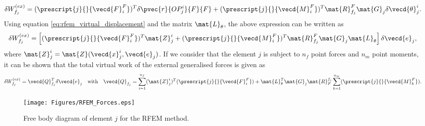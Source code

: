 \[
    \delta W_{f_j}^{(ex)} = (\prescript{j}{}{\vecd{F}^{F}_{i}})^{T} \delta 
    \pvec{r}{OP_{j}^{i}}{F}{F} + (\prescript{j}{}{\vecd{M}^{F}_{i}})^{T}
    \mat{R}_{f_j}^{F} \mat{G}_{j} \delta \vecd{\theta}_{j}^{i}.
\]
Using equation \eqref{eq:rfem_virtual_displacement} and the matrix $\mat{L}_{\theta}$, the above expression can be written as
\begin{equation}
    \delta W_{f_j}^{(ex)} = \left[(\prescript{j}{}{\vecd{F}^{F}_{i}})^{T}
    \mat{Z}_{j}^{i} + (\prescript{j}{}{\vecd{M}^{F}_{i}})^{T}
    \mat{R}_{f_j}^{F} \mat{G}_{j} \mat{L}_{\theta} \right] \delta \vecd{e}_{j},
    \label{eq:rfem_virtual_work_external_one_force}
\end{equation}
where $\mat{Z}_{j}^{i} = \mat{Z}(\vecd{x}_{j}^{i} , \vecd{e}_{j})$. If we consider that the element $j$ is subject to $n_{f}$ point forces and $n_m$ point moments,
it can be shown that the total virtual work of the external generalised forces is given as
\begin{equation}
    \delta W_{f_j}^{(ex)} = \vecd{Q}_{f_j}^{T} \delta \vecd{e}_{j}
    \quad \text{with} \quad 
    \vecd{Q}_{f_j} = \sum_{i = 1}^{n_f} (\mat{Z}_{j}^{i})^{T}
    (\prescript{j}{}{\vecd{F}^{F}_{i}}) +
    \mat{L}_{\theta}^{T} \mat{G}_{j} \mat{R}_{F}^{f_{j}}\sum_{k = 1}^{n_m} 
    (\prescript{j}{}{\vecd{M}^{F}_{k}}).
    \label{eq:rfem_virtual_work_external}
\end{equation}

\begin{figure}
    \centering\texttt{[image: Figures/RFEM\_Forces.eps]}
    \caption{Free body diagram of element $j$ for the RFEM method.}
    \label{fig:rfem_external_forces}
\end{figure}


